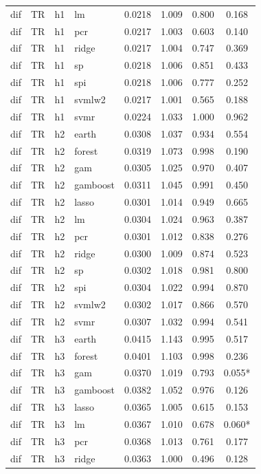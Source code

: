 \begin{ThreePartTable}
\begin{longtable}[t]{llclcccc}
dif & TR & h1 & lm & 0.0218 & 1.009 & 0.800 & 0.168\\
dif & TR & h1 & pcr & 0.0217 & 1.003 & 0.603 & 0.140\\
dif & TR & h1 & ridge & 0.0217 & 1.004 & 0.747 & 0.369\\
dif & TR & h1 & sp & 0.0218 & 1.006 & 0.851 & 0.433\\
dif & TR & h1 & spi & 0.0218 & 1.006 & 0.777 & 0.252\\
dif & TR & h1 & svmlw2 & 0.0217 & 1.001 & 0.565 & 0.188\\
dif & TR & h1 & svmr & 0.0224 & 1.033 & 1.000 & 0.962\\
\addlinespace
dif & TR & h2 & earth & 0.0308 & 1.037 & 0.934 & 0.554\\
dif & TR & h2 & forest & 0.0319 & 1.073 & 0.998 & 0.190\\
dif & TR & h2 & gam & 0.0305 & 1.025 & 0.970 & 0.407\\
dif & TR & h2 & gamboost & 0.0311 & 1.045 & 0.991 & 0.450\\
dif & TR & h2 & lasso & 0.0301 & 1.014 & 0.949 & 0.665\\
dif & TR & h2 & lm & 0.0304 & 1.024 & 0.963 & 0.387\\
dif & TR & h2 & pcr & 0.0301 & 1.012 & 0.838 & 0.276\\
dif & TR & h2 & ridge & 0.0300 & 1.009 & 0.874 & 0.523\\
dif & TR & h2 & sp & 0.0302 & 1.018 & 0.981 & 0.800\\
dif & TR & h2 & spi & 0.0304 & 1.022 & 0.994 & 0.870\\
dif & TR & h2 & svmlw2 & 0.0302 & 1.017 & 0.866 & 0.570\\
dif & TR & h2 & svmr & 0.0307 & 1.032 & 0.994 & 0.541\\
\addlinespace
dif & TR & h3 & earth & 0.0415 & 1.143 & 0.995 & 0.517\\
dif & TR & h3 & forest & 0.0401 & 1.103 & 0.998 & 0.236\\
dif & TR & h3 & gam & 0.0370 & 1.019 & 0.793 & 0.055*\\
dif & TR & h3 & gamboost & 0.0382 & 1.052 & 0.976 & 0.126\\
dif & TR & h3 & lasso & 0.0365 & 1.005 & 0.615 & 0.153\\
dif & TR & h3 & lm & 0.0367 & 1.010 & 0.678 & 0.060*\\
dif & TR & h3 & pcr & 0.0368 & 1.013 & 0.761 & 0.177\\
dif & TR & h3 & ridge & 0.0363 & 1.000 & 0.496 & 0.128\\

\end{longtable}
\end{ThreePartTable}
